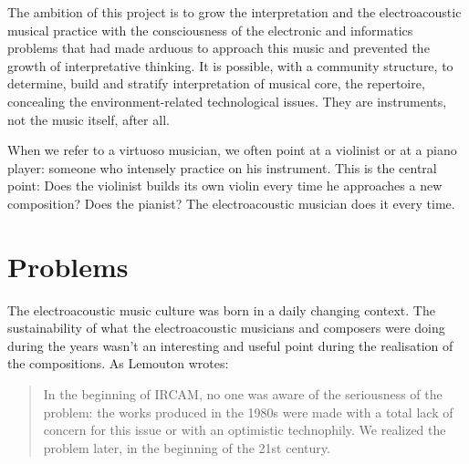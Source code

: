 \documentclass[twoside,a4paper]{article}
\begin{document}
The ambition of this project is to grow the interpretation and the electroacoustic musical practice with the consciousness of the electronic and informatics problems that had made arduous to approach this music and prevented the growth of interpretative thinking. It is possible, with a community structure, to determine, build and stratify interpretation of musical core, the repertoire, concealing the environment-related technological issues. They are instruments, not the music itself, after all.

When we refer to a virtuoso musician, we often point at a violinist or at a piano player: someone who intensely practice on his instrument. This is the central point: Does the violinist builds its own violin every time he approaches a new composition? Does the pianist? The electroacoustic musician does it every time.



\section{Problems}
\label{sec:problems}

The electroacoustic music culture was born in a daily changing context. The sustainability of what the electroacoustic musicians and composers were doing during the years wasn't an interesting and useful point during the realisation of the compositions. As Lemouton wrotes: 

\begin{quote}
In the beginning of IRCAM, no one was aware of the seriousness of the problem: the works produced in the 1980s were made with a total lack of concern for this issue or with an optimistic technophily. We realized the problem later, in the beginning of the 21st century\cite{Lem16}.
\end{quote}
\end{document}
